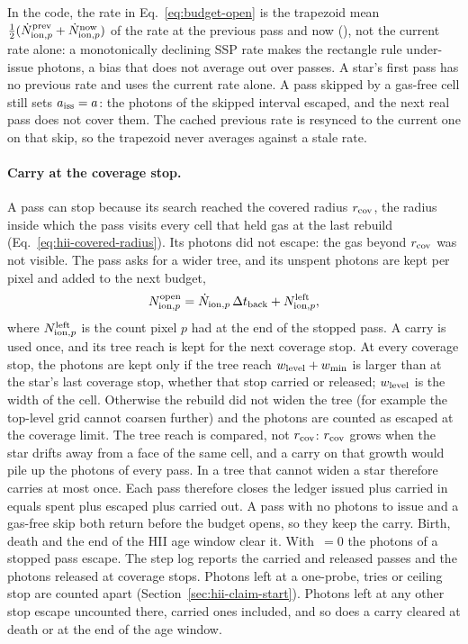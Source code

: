 In the code, the rate in Eq.~\ref{eq:budget-open} is the trapezoid mean
$\tfrac{1}{2}(\dot N_{{\rm ion},p}^{\rm prev} + \dot N_{{\rm ion},p}^{\rm now})$
of the rate at the previous pass and now (), not
the current rate alone: a monotonically declining SSP rate makes the
rectangle rule under-issue photons, a bias that does not average out over
passes. A star's first pass has no previous rate and uses the current rate
alone. A pass skipped by a gas-free cell still sets $a_{\rm iss} = a$: the
photons of the skipped interval escaped, and the next real pass does not
cover them. The cached previous rate is resynced to the current one on
that skip, so the trapezoid never averages against a stale rate.

\paragraph{Carry at the coverage stop.}\label{sec:budget-carry} A pass can
stop because its search reached the covered radius $r_{\rm cov}$, the
radius inside which the pass visits every cell that held gas at the last rebuild
(Eq.~\eqref{eq:hii-covered-radius}). Its photons did not escape: the gas beyond
$r_{\rm cov}$ was not visible. The pass asks for a wider tree, and its
unspent photons are kept per pixel and added to the next budget,
\begin{equation}
  N_{{\rm ion},p}^{\rm open} =
  \dot N_{{\rm ion},p}\,\Delta t_{\rm back} + N_{{\rm ion},p}^{\rm left},
  \label{eq:budget-carry}
\end{equation}
where $N_{{\rm ion},p}^{\rm left}$ is the count pixel $p$ had at the end of
the stopped pass. A carry is used once, and its tree reach is kept for the
next coverage stop. At every coverage stop, the photons
are kept only if the tree reach $w_{\rm level} + w_{\rm min}$ is larger than
at the star's last coverage stop, whether that stop carried or released;
$w_{\rm level}$ is the width of the  cell. Otherwise
the rebuild did not widen the tree (for example the top-level grid cannot
coarsen further) and the photons are counted as escaped at the coverage
limit. The tree reach is compared, not $r_{\rm cov}$: $r_{\rm cov}$ grows
when the star drifts away from a face of the same cell, and a carry on that
growth would pile up the photons of every pass. In a tree that cannot widen
a star therefore carries at most once. Each pass therefore
closes the ledger issued plus carried in equals spent plus escaped plus
carried out. A pass with no photons to issue and a gas-free skip both
return before the budget opens, so they keep the carry. Birth, death and the end of
the HII age window clear it. With
$\,=0$ the photons
of a stopped pass escape. The step log reports the carried and released
passes and the photons released at coverage stops. Photons left at a
one-probe, tries or ceiling stop are counted apart
(Section~\ref{sec:hii-claim-start}). Photons left at any other stop escape
uncounted there, carried ones included, and so does a carry cleared at death
or at the end of the age window.

